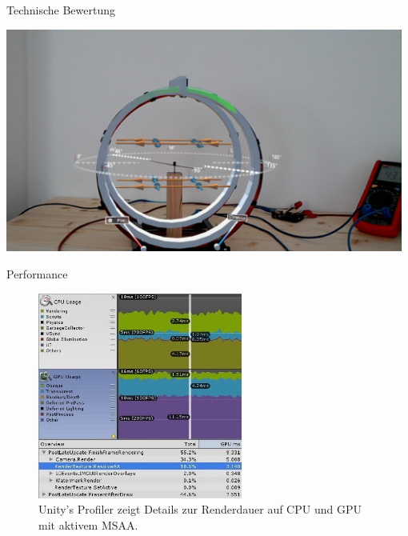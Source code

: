 \begin{frame}[fragile]{Technische Bewertung}
\begin{minipage}{0.35\textwidth}
	\includegraphics[width=0.98\textwidth]{images/HL/model-overlay.jpg}
\end{minipage}
\end{frame}

\begin{frame}[fragile]{Performance}
\begin{figure}
	\vspace{-20px}
	\hspace{100px}
	\centering
	\includegraphics[width=0.6\textwidth]{images/performance/profile_MSAA_on_cut.jpg}\\
	\scriptsize Unity's Profiler zeigt Details zur Renderdauer auf CPU und GPU mit aktivem MSAA.
\end{figure}
\end{frame}

